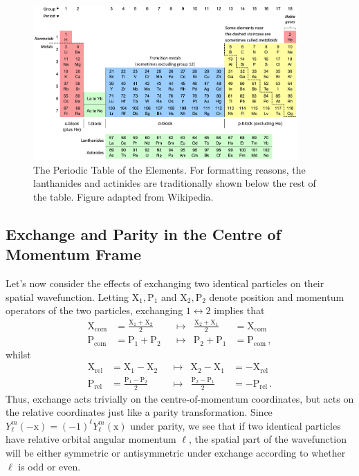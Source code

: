\documentclass{article}
\theoremstyle{plain}\theoremheaderfont{\normalfont\itshape}\theorembodyfont{\rmfamily}\theoremseparator{.}\newtheorem*{rem}{Remark}\newtheorem*{ex}{Example}\newtheorem*{proof}{Proof}\newtheorem*{altp}{Alternative proof}
\theoremstyle{plain}\theoremheaderfont{\normalfont\bfseries}\theorembodyfont{\rmfamily}\theoremseparator{.}\newtheorem{thm}{Theorem}[section]\newtheorem{lem}[thm]{Lemma}\newtheorem{prop}[thm]{Proposition}\newtheorem*{cor}{Corollary}\newtheorem{defn}[thm]{Definition}\newtheorem{clm}[thm]{Claim}\newtheorem{clminproof}{Claim}
\theoremstyle{break}\theoremheaderfont{\normalfont\itshape}\theorembodyfont{\rmfamily}\theoremseparator{.\medskip}\newtheorem*{proofskip}{Proof}\newtheorem*{exs}{Examples}\newtheorem*{rems}{Remarks}
\theoremstyle{break}\theoremheaderfont{\normalfont\bfseries}\theorembodyfont{\rmfamily}\theoremseparator{.\medskip}\newtheorem{lemskip}[thm]{Lemma}\newtheorem{defnskip}[thm]{Definition}\newtheorem{propskip}[thm]{Proposition}\newtheorem{thmskip}[thm]{Theorem}
\numberwithin{equation}{section}
\newcommand{\vb}[1]{\bm{\mathrm{#1}}}
\begin{document}
    \begin{figure}
        \centering
        \includegraphics[width=0.9\textwidth]{periodic_table.png}
        \caption{The Periodic Table of the Elements. For formatting reasons, the lanthanides and actinides are traditionally shown below the rest of the table. Figure adapted from Wikipedia.}
    \end{figure}

    \subsection{Exchange and Parity in the Centre of Momentum Frame}
    Let's now consider the effects of exchanging two identical particles on their spatial wavefunction. Letting \(\vb{X}_1,\vb{P}_1\) and \(\vb{X}_2,\vb{P}_2\) denote position and momentum operators of the two particles, exchanging \(1\leftrightarrow 2\) implies that
    \begin{align}
        \vb{X}_{\text{com}}&=\frac{\vb{X}_1+\vb{X}_2}{2} & &\longmapsto & \frac{\vb{X}_2+\vb{X}_1}{2}&=\vb{X}_{\text{com}}\\
        \vb{P}_{\text{com}}&=\vb{P}_1+\vb{P}_2 & &\longmapsto & \vb{P}_2+\vb{P}_1&=\vb{P}_{\text{com}}\,,
    \end{align}
    whilst
    \begin{align}
        \vb{X}_{\text{rel}}&=\vb{X}_1-\vb{X}_2 & &\longmapsto & \vb{X}_2-\vb{X}_1&=-\vb{X}_{\text{rel}}\\
        \vb{P}_{\text{rel}}&=\frac{\vb{P}_1-\vb{P}_2}{2} & &\longmapsto & \frac{\vb{P}_2-\vb{P}_1}{2}&=-\vb{P}_{\text{rel}}\,.
    \end{align}
    Thus, exchange acts trivially on the centre-of-momentum coordinates, but acts on the relative coordinates just like a parity transformation. Since \(Y_\ell^m(-\vb{x})=(-1)^\ell Y_\ell^m(\vb{x})\) under parity, we see that if two identical particles have relative orbital angular momentum \(\ell\), the spatial part of the wavefunction will be either symmetric or antisymmetric under exchange according to whether \(\ell\) is odd or even.
\end{document}
